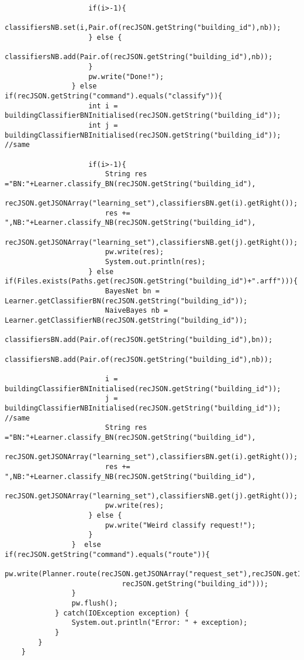 \documentclass{article}
\begin{document}
\begin{lstlisting}
                    if(i>-1){
                        classifiersNB.set(i,Pair.of(recJSON.getString("building_id"),nb));
                    } else {
                        classifiersNB.add(Pair.of(recJSON.getString("building_id"),nb));
                    }
                    pw.write("Done!");
                } else if(recJSON.getString("command").equals("classify")){
                    int i = buildingClassifierBNInitialised(recJSON.getString("building_id"));
                    int j = buildingClassifierNBInitialised(recJSON.getString("building_id")); //same

                    if(i>-1){
                        String res ="BN:"+Learner.classify_BN(recJSON.getString("building_id"),
                                recJSON.getJSONArray("learning_set"),classifiersBN.get(i).getRight());
                        res += ",NB:"+Learner.classify_NB(recJSON.getString("building_id"),
                                recJSON.getJSONArray("learning_set"),classifiersNB.get(j).getRight());
                        pw.write(res);
                        System.out.println(res);
                    } else if(Files.exists(Paths.get(recJSON.getString("building_id")+".arff"))){
                        BayesNet bn = Learner.getClassifierBN(recJSON.getString("building_id"));
                        NaiveBayes nb = Learner.getClassifierNB(recJSON.getString("building_id"));
                        classifiersBN.add(Pair.of(recJSON.getString("building_id"),bn));
                        classifiersNB.add(Pair.of(recJSON.getString("building_id"),nb));

                        i = buildingClassifierBNInitialised(recJSON.getString("building_id"));
                        j = buildingClassifierNBInitialised(recJSON.getString("building_id")); //same
                        String res ="BN:"+Learner.classify_BN(recJSON.getString("building_id"),
                                recJSON.getJSONArray("learning_set"),classifiersBN.get(i).getRight());
                        res += ",NB:"+Learner.classify_NB(recJSON.getString("building_id"),
                                recJSON.getJSONArray("learning_set"),classifiersNB.get(j).getRight());
                        pw.write(res);
                    } else {
                        pw.write("Weird classify request!");
                    }
                }  else if(recJSON.getString("command").equals("route")){
                    pw.write(Planner.route(recJSON.getJSONArray("request_set"),recJSON.getInt("deadline"),
                            recJSON.getString("building_id")));
                }
                pw.flush();
            } catch(IOException exception) {
                System.out.println("Error: " + exception);
            }
        }
    }


\end{lstlisting}
\end{document}
